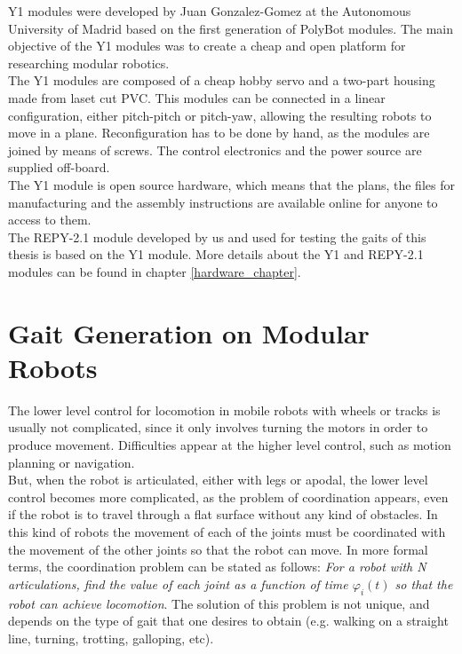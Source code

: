 Y1\cite{gonzalez-gomez_website:y1} modules were developed by Juan Gonzalez-Gomez at the Autonomous University of Madrid based on the first generation of PolyBot modules. The main objective of the Y1 modules was to create a cheap and open platform for researching modular robotics.
\\

The Y1 modules are composed of a cheap hobby servo and a two-part housing made from laset cut PVC. This modules can be connected in a linear configuration, either pitch-pitch or pitch-yaw, allowing the resulting robots to move in a plane. Reconfiguration has to be done by hand, as the modules are joined by means of screws. The control electronics and the power source are supplied off-board.
\\

The Y1 module is open source hardware, which means that the plans, the files for manufacturing and the assembly instructions are available online for anyone to access to them. 
\\

The REPY-2.1 module developed by us and used for testing the gaits of this thesis is based on the Y1 module. More details about the Y1 and REPY-2.1 modules can be found in chapter \ref{hardware_chapter}.



\section{Gait Generation on Modular Robots}
\label{state_art_controllers}

The lower level control for locomotion in mobile robots with wheels or tracks is usually not complicated, since it only involves turning the motors in order to produce movement. Difficulties appear at the higher level control, such as motion planning or navigation.\\

But, when the robot is articulated, either with legs or apodal, the lower level control becomes more complicated, as the problem of coordination appears, even if the robot is to travel through a flat surface without any kind of obstacles. In this kind of robots the movement of each of the joints must be coordinated with the movement of the other joints so that the robot can move. In more formal terms, the coordination problem can be stated as follows: \emph{For a robot with N articulations, find the value of each joint as a function of time $\varphi_i(t)$ so that the robot can achieve locomotion}. The solution of this problem is not unique, and depends on the type of gait that one desires to obtain (e.g. walking on a straight line, turning, trotting, galloping, etc).\\

